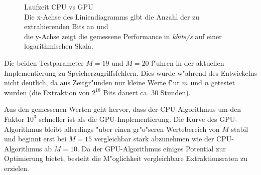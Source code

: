 \begin{comment}
\begin{figure}
	\centering
	\texttt{[image: combined.pdf]}
	\caption{Laufzeit CPU vs GPU}
	\label{fig:laufzeitCpuGpu}
\end{figure}
\end{comment}
\begin{figure}[h]
\centering
{}
\caption{Laufzeit CPU vs GPU \protect\\ \normalfont Die x-Achse des Liniendiagramms gibt die Anzahl der zu extrahierenden Bits an und \protect\\ die y-Achse zeigt die gemessene Performance in \emph{kbits/s} auf einer logarithmischen Skala.}
\label{fig:laufzeitCpuGpu2}
\end{figure}

Die beiden Testparameter $M=19$ und $M=20$ f"uhren in der aktuellen Implementierung zu Speicherzugriffsfehlern. Dies wurde w"ahrend des Entwickelns nicht deutlich, da aus Zeitgr"unden nur kleine Werte f"ur $m$ und $n$ getestet wurden (die Extraktion von $2^{18}$ Bits dauert ca. 30 Stunden).

Aus den gemessenen Werten geht hervor, dass der CPU-Algorithmus um den Faktor $10^3$ schneller ist als die GPU-Implementierung. Die Kurve des GPU-Algorithmus bleibt allerdings "uber einen gr"o"seren Wertebereich von $M$ stabil und beginnt erst bei $M=15$ vergleichbar stark abzunehmen wie der CPU-Algorithmus ab $M=10$. Da der GPU-Algorithmus einiges Potential zur Optimierung bietet, besteht die M"oglichkeit vergleichbare Extraktionsraten zu erzielen.
